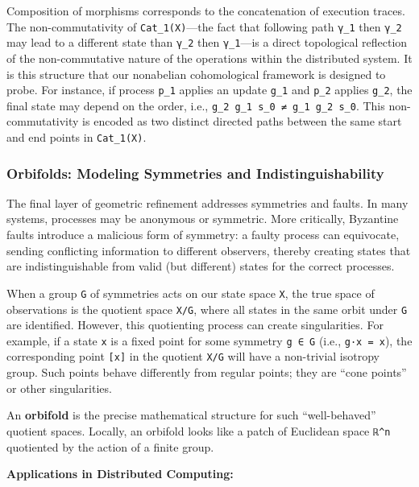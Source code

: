 \documentclass[
]{article}
\begin{document}
Composition of morphisms corresponds to the concatenation of execution
traces. The non-commutativity of \texttt{Cat\_1(X)}---the fact that
following path \texttt{γ\_1} then \texttt{γ\_2} may lead to a different
state than \texttt{γ\_2} then \texttt{γ\_1}---is a direct topological
reflection of the non-commutative nature of the operations within the
distributed system. It is this structure that our nonabelian
cohomological framework is designed to probe. For instance, if process
\texttt{p\_1} applies an update \texttt{g\_1} and \texttt{p\_2} applies
\texttt{g\_2}, the final state may depend on the order, i.e.,
\texttt{g\_2\ g\_1\ s\_0\ ≠\ g\_1\ g\_2\ s\_0}. This non-commutativity
is encoded as two distinct directed paths between the same start and end
points in \texttt{Cat\_1(X)}.

\subsubsection{\texorpdfstring{\textbf{Orbifolds: Modeling Symmetries
and
Indistinguishability}}{Orbifolds: Modeling Symmetries and Indistinguishability}}\label{orbifolds-modeling-symmetries-and-indistinguishability}

The final layer of geometric refinement addresses symmetries and faults.
In many systems, processes may be anonymous or symmetric. More
critically, Byzantine faults introduce a malicious form of symmetry: a
faulty process can equivocate, sending conflicting information to
different observers, thereby creating states that are indistinguishable
from valid (but different) states for the correct processes.

When a group \texttt{G} of symmetries acts on our state space
\texttt{X}, the true space of observations is the quotient space
\texttt{X/G}, where all states in the same orbit under \texttt{G} are
identified. However, this quotienting process can create singularities.
For example, if a state \texttt{x} is a fixed point for some symmetry
\texttt{g\ ∈\ G} (i.e., \texttt{g·x\ =\ x}), the corresponding point
\texttt{{[}x{]}} in the quotient \texttt{X/G} will have a non-trivial
isotropy group. Such points behave differently from regular points; they
are ``cone points'' or other singularities.

An \textbf{orbifold} is the precise mathematical structure for such
``well-behaved'' quotient spaces. Locally, an orbifold looks like a
patch of Euclidean space \texttt{ℝ\^{}n} quotiented by the action of a
finite group.

\textbf{Applications in Distributed Computing:}
\end{document}
